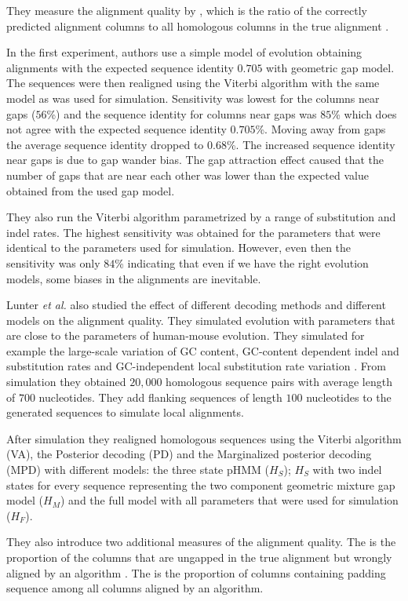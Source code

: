 They measure the alignment quality by , which is the
ratio of the correctly predicted alignment columns to all homologous columns in
the true alignment \cite{Lunter2008}. 

In the first experiment, authors use a simple model of evolution obtaining
alignments with the expected sequence identity $0.705$ with geometric gap model.
The sequences were then realigned using the Viterbi algorithm with the same
model as was used for simulation. Sensitivity was lowest for the  columns near
gaps ($56$\%) and the sequence identity for columns near gaps was $85$\% which
does not agree with the expected sequence identity $0.705$\%.  Moving away from
gaps the average sequence identity dropped to  $0.68$\%. The increased sequence
identity near gaps is due to gap wander bias. The gap attraction effect caused
that the number of gaps that are  near each other was lower than the expected
value obtained from the used gap model.

They also run the Viterbi algorithm parametrized by a range of substitution and
indel rates. The highest sensitivity was obtained for the parameters that were
identical to the parameters used for simulation. However, even then the
sensitivity was only $84$\% indicating that even if we have the right evolution
models, some biases in the alignments are inevitable.  

Lunter {\it et al.} also studied the effect of different decoding methods and
different models on the alignment quality. They simulated evolution with
parameters that are close to the parameters of human-mouse evolution. They
simulated for example the large-scale variation of GC content, GC-content
dependent indel and substitution rates and GC-independent local substitution
rate variation \cite{Lunter2008}.  From simulation they obtained $20,000$
homologous sequence pairs with average length of $700$ nucleotides. They add
flanking sequences of length $100$ nucleotides to the generated sequences  to
simulate local alignments.

After simulation they realigned homologous sequences using the Viterbi algorithm
(VA), the Posterior decoding (PD) and the Marginalized posterior decoding (MPD)
with different models: the three state pHMM ($H_S$); $H_S$ with two indel states
for
every sequence  representing the two component geometric mixture gap model ($H_M$) and the
full model with all parameters that were used for simulation ($H_F$).

They also introduce two additional measures of the alignment quality. The
 is the proportion of the columns that
are ungapped in the true alignment but wrongly aligned by an algorithm
\cite{Lunter2008}. The  is the
proportion of columns containing padding sequence among all columns aligned by
an algorithm.



